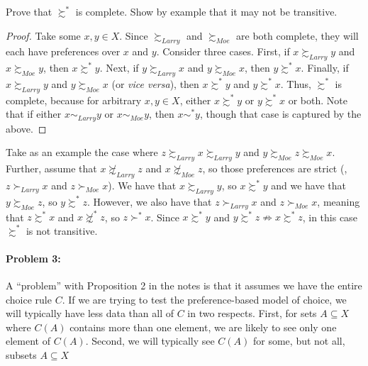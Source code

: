 \documentclass[12pt]{article}
\begin{document}
Prove that $\succsim^*$ is complete. Show by example that it may not be transitive.

\begin{proof}
    Take some $x,y \in X$. Since $\succsim_{Larry}$ and $\succsim_{Moe}$ are both complete, they will each have preferences over $x$ and $y$. Consider three cases. First, if $x \succsim_{Larry} y$ and $x \succsim_{Moe} y$, then $x \succsim^* y$. Next, if $y \succsim_{Larry} x$ and $y \succsim_{Moe} x$, then $y \succsim^* x$. Finally, if $x \succsim_{Larry} y$ and $y \succsim_{Moe} x$ (or \emph{vice versa}), then $x \succsim^* y$ and $y \succsim^* x$. Thus, $\succsim^*$ is complete, because for arbitrary $x,y \in X$, either $x \succsim^* y$ or $y \succsim^* x$ or both. Note that if either $x \sim_{Larry} y$ or $x \sim_{Moe} y$, then $x \sim^* y$, though that case is captured by the above.
\end{proof}


    Take as an example the case where $z \succsim_{Larry} x \succsim_{Larry} y$ and $y \succsim_{Moe} z \succsim_{Moe} x$. Further, assume that $x \not\succsim_{Larry} z$ and $x \not\succsim_{Moe} z$, so those preferences are strict (\ie, $z \succ_{Larry} x$ and $z \succ_{Moe} x$). We have that $x \succsim_{Larry} y$, so $x \succsim^* y$ and we have that $y \succsim_{Moe} z$, so $y \succsim^* z$. However, we also have that $z \succ_{Larry} x$ and $z \succ_{Moe} x$, meaning that $z \succsim^* x$ and $x \not\succsim^* z$, so $z \succ^* x$. Since $x \succsim^* y$ and $y \succsim^* z \not\Rightarrow x \succsim^* z$, in this case $\succsim^*$ is not transitive.

\paragraph{Problem 3:} A ``problem'' with Proposition 2 in the notes is that it assumes we have the entire choice rule $C$. If we are trying to test the preference-based model of choice, we will typically have less data than all of $C$ in two respects. First, for sets $A \subseteq X$ where $C(A)$ contains more than one element, we are likely to see only one element of $C(A)$. Second, we will typically see $C(A)$ for some, but not all, subsets $A \subseteq X$
\end{document}
